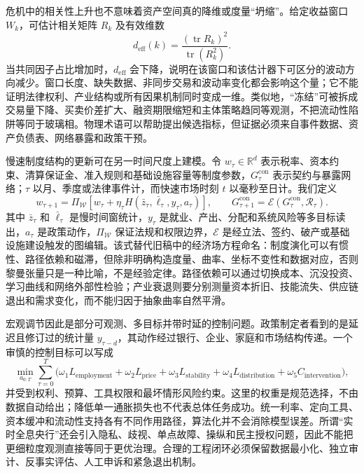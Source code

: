 危机中的相关性上升也不意味着资产空间真的降维或度量“坍缩”。给定收益窗口 $W_k$，可估计相关矩阵 $R_k$ 及有效维数
\[
d_{\mathrm{eff}}(k)=\frac{(\operatorname{tr}R_k)^2}{\operatorname{tr}(R_k^2)}.
\]
当共同因子占比增加时，$d_{\mathrm{eff}}$ 会下降，说明在该窗口和该估计器下可区分的波动方向减少。窗口长度、缺失数据、非同步交易和波动率变化都会影响这个量；它不能证明法律权利、产业结构或所有因果机制同时变成一维。类似地，“冻结”可被拆成交易量下降、买卖价差扩大、融资期限缩短和主体策略趋同等观测，不把流动性陷阱等同于玻璃相。物理术语可以帮助提出候选指标，但证据必须来自事件数据、资产负债表、网络暴露和政策干预。

\label{subsec:economic_cefe}
慢速制度结构的更新可在另一时间尺度上建模。令 $w_\tau\in\mathbb R^d$ 表示税率、资本约束、清算保证金、准入规则和基础设施容量等制度参数，$G_\tau^{\mathrm{con}}$ 表示契约与暴露网络；$\tau$ 以月、季度或法律事件计，而快速市场时刻 $t$ 以毫秒至日计。我们定义
\begin{equation}
w_{\tau+1}=\Pi_{\mathcal W}\!\left[w_\tau+\eta_\tau
H(\bar z_\tau,\bar \ell_\tau,y_\tau,a_\tau)
\right],
\qquad
G_{\tau+1}^{\mathrm{con}}=\mathcal E(G_\tau^{\mathrm{con}},\mathcal R_\tau).
\label{eq:economic_cefe}
\end{equation}
其中 $\bar z_\tau$ 和 $\bar\ell_\tau$ 是慢时间窗统计，$y_\tau$ 是就业、产出、分配和系统风险等多目标读出，$a_\tau$ 是政策动作，$\Pi_{\mathcal W}$ 保证法规和权限边界，$\mathcal E$ 是经立法、签约、破产或基础设施建设触发的图编辑。该式替代旧稿中的经济场方程命名：制度演化可以有惯性、路径依赖和磁滞，但除非明确构造度量、曲率、坐标不变性和数据对应，否则黎曼张量只是一种比喻，不是经验定律。路径依赖可以通过切换成本、沉没投资、学习曲线和网络外部性检验；产业衰退则要分别测量资本折旧、技能流失、供应链退出和需求变化，而不能归因于抽象曲率自然平滑。

宏观调节因此是部分可观测、多目标并带时延的控制问题。政策制定者看到的是延迟且修订过的统计量 $y_{\tau-d}$，其动作经过银行、企业、家庭和市场结构传递。一个审慎的控制目标可以写成
\[
\min_{a_{0:T}}\sum_{\tau=0}^{T}
\bigl(\omega_1 L_{\mathrm{employment}}+\omega_2 L_{\mathrm{price}}
+\omega_3 L_{\mathrm{stability}}+\omega_4 L_{\mathrm{distribution}}
+\omega_5 C_{\mathrm{intervention}}\bigr),
\]
并受到权利、预算、工具权限和最坏情形风险约束。这里的权重是规范选择，不由数据自动给出；降低单一通胀损失也不代表总体任务成功。统一利率、定向工具、资本缓冲和流动性支持各有不同作用路径，算法化并不会消除模型误差。所谓“实时全息央行”还会引入隐私、歧视、单点故障、操纵和民主授权问题，因此不能把更细粒度观测直接等同于更优治理。合理的工程闭环必须保留数据最小化、独立审计、反事实评估、人工申诉和紧急退出机制。

